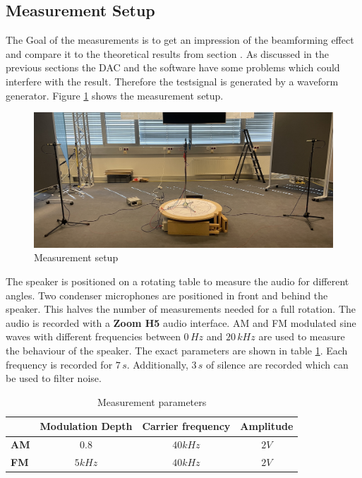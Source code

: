 \subsection{Measurement Setup}

The Goal of the measurements is to get an impression of the beamforming effect and compare it to the theoretical results from section . As discussed in the previous sections the DAC and the software have some problems which could interfere with the result. Therefore the testsignal is generated by a waveform generator. Figure \ref{fig:meas:beam:setup} shows the measurement setup.
%
\begin{figure}[ht]
  \centering
  \includegraphics[height=\smallheight]{src/assets/pictures/measurements/beamforming_meas_setup.JPG}
  \caption{Measurement setup}\label{fig:meas:beam:setup}
\end{figure}
\p
The speaker is positioned on a rotating table to measure the audio for different angles. Two condenser microphones are positioned in front and behind the speaker. This halves the number of measurements needed for a full rotation. The audio is recorded with a \textbf{Zoom H5} audio interface.\p
%
AM and FM modulated sine waves with different frequencies between $0\,Hz$ and $20\,kHz$ are used to measure the behaviour of the speaker. The exact parameters are shown in table \ref{tab:meas:beam:params}. Each frequency is recorded for $7\,s$. Additionally, $3\,s$ of silence are recorded which can be used to filter noise.
%
\begin{table}[ht]
  \caption{Measurement parameters}\label{tab:meas:beam:params}
  \begin{tabular}{l||c|c|c}
    & \textbf{Modulation Depth} & \textbf{Carrier frequency}  & \textbf{Amplitude}\\
    \hline
    \textbf{AM} & $0.8$         & $40kHz$                     & $2V$ \\
    \textbf{FM} & $5kHz$        & $40kHz$                     & $2V$ \\
  \end{tabular}
\end{table}
